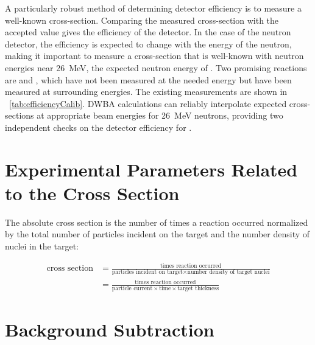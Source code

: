 A particularly robust method of determining detector efficiency is to measure a well-known cross-section.  Comparing the measured cross-section with the accepted value gives the efficiency of the detector.  In the case of the neutron detector, the efficiency is expected to change with the energy of the neutron, making it important to measure a cross-section that is well-known with neutron energies near 26~MeV, the expected neutron energy of \reaction.  Two promising reactions are \DuReaction and \MgReaction, which have not been measured at the needed energy but have been measured at surrounding energies.  The existing measurements are shown in {\tab}~\ref{tab:efficiencyCalib}. DWBA calculations can reliably interpolate expected cross-sections at appropriate beam energies for 26~MeV neutrons, providing two independent checks on the detector efficiency for \reaction.



\section{Experimental Parameters Related to the Cross Section}

The absolute cross section is the number of times a reaction occurred normalized by the total number of particles incident on the target and the number density of nuclei in the target:

\begin{align}
\text{cross section} &= \frac{\text{times reaction occurred}}{\text{particles incident on target} \times \text{number density of target nuclei}} \\
                     &= \frac{\text{times reaction occurred}}{\text{particle current} \times \text{time} \times \text{target thickness}}
\label{eq:cross_section}
\end{align}

\section{Background Subtraction}

